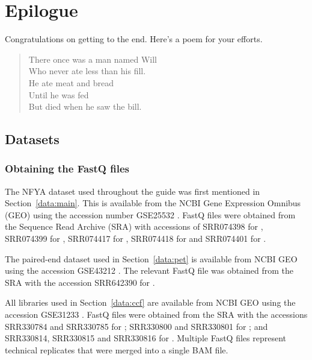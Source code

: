 \documentclass{report}\usepackage[]{graphicx}\usepackage[usenames,dvipsnames]{color}
\newenvironment{combox}
{ \definecolor{shadecolor}{RGB}{255, 240, 240} \begin{shaded}\begin{center}\begin{minipage}[t]{0.95\textwidth} }
{ \end{minipage}\end{center}\end{shaded} \definecolor{shadecolor}{RGB}{240,240,240} }
\begin{document}

\chapter{Epilogue}

\begin{combox}
Congratulations on getting to the end. Here's a poem for your efforts.
\begin{quote}
There once was a man named Will \\
Who never ate less than his fill. \\
He ate meat and bread \\
Until he was fed \\
But died when he saw the bill. 
\end{quote}
\end{combox}

\section{Datasets}
\label{sec:dataset}

\subsection{Obtaining the FastQ files}
The NFYA dataset used throughout the guide was first mentioned in Section~\ref{data:main}. 
This is available from the NCBI Gene Expression Omnibus (GEO) using the accession number GSE25532 \cite{tiwari2012}.
FastQ files were obtained from the Sequence Read Archive (SRA) with accessions of SRR074398 for , SRR074399 for , SRR074417 for , SRR074418 for  and SRR074401 for .

The paired-end dataset used in Section~\ref{data:pet} is available from NCBI GEO using the accession GSE43212 \cite{pal2013}.
The relevant FastQ file was obtained from the SRA with the accession SRR642390 for .

All libraries used in Section~\ref{data:ccf} are available from NCBI GEO using the accession GSE31233 \cite{zhang2012}.
FastQ files were obtained from the SRA with the accessions SRR330784 and SRR330785 for ; SRR330800 and SRR330801 for ; and SRR330814, SRR330815 and SRR330816 for . 
Multiple FastQ files represent technical replicates that were merged into a single BAM file.
\end{document}
